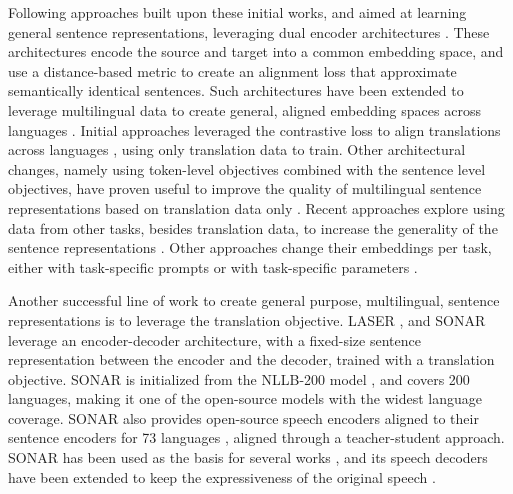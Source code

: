\documentclass[twoside,11pt]{fairmeta}
\newcommand{\sonar}{\textsc{SONAR}\xspace}
\begin{document}
Following approaches built upon these initial works, and aimed at learning general sentence representations, leveraging dual encoder architectures \citep{guo2018effective, reimers2019sentence, ni2021sentence}.
These architectures encode the source and target into a common embedding space, and use a distance-based metric to create an alignment loss that approximate semantically identical sentences.
Such architectures have been extended to leverage multilingual data to create general, aligned embedding spaces across languages \citep{labse, mexma, sturua2024jinaembeddingsv3multilingualembeddingstask}.
Initial approaches leveraged the contrastive loss to align translations across languages \citep{labse, yang2019improving}, using only translation data to train.
Other architectural changes, namely using token-level objectives combined with the sentence level objectives, have proven useful to improve the quality of multilingual sentence representations based on translation data only \citep{li-etal-2023-dual, mexma}.
Recent approaches explore using data from other tasks, besides translation data, to increase the generality of the sentence representations \citep{wang2024multilinguale5textembeddings, mohr2024multitaskcontrastivelearning8192token}.
Other approaches change their embeddings per task, either with task-specific prompts \citep{wang2024multilinguale5textembeddings, su2022one, lee2024geckoversatiletextembeddings} or with task-specific parameters \citep{sturua2024jinaembeddingsv3multilingualembeddingstask}.

Another successful line of work to create general purpose, multilingual, sentence representations is to leverage the translation objective.
\textsc{LASER} \citep{Artetxe:2019:tacl_massive_ml}, and \sonar \citep{Duquenne:2023:sonar_arxiv} leverage an encoder-decoder architecture, with a fixed-size sentence representation between the encoder and the decoder, trained with a translation objective.
\sonar is initialized from the NLLB-200 model \citep{nllb2022}, and covers 200 languages, making it one of the open-source models with the widest language coverage.
\sonar also provides open-source speech encoders aligned to their sentence encoders for 73 languages \citep{seamlessv2:arxiv:2023}, aligned through a teacher-student approach.
\sonar has been used as the basis for several works \citep{seamlessv2:arxiv:2023, SeamlessM4TArXiv, chen-etal-2023-blaser}, and its speech decoders have been extended to keep the expressiveness of the original speech \citep{Duquenne:2023:sonarexp_arxiv}.
\end{document}
